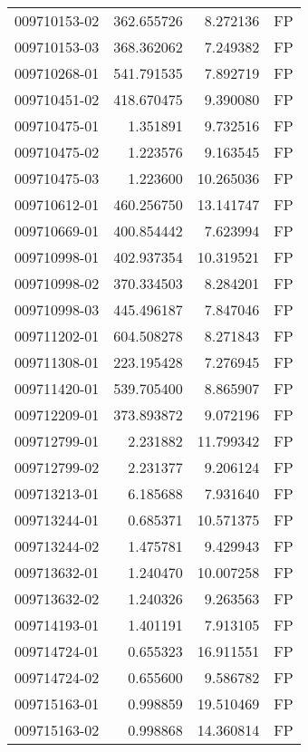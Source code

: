 \begin{tabular}{lrrl}
009710153-02 &  362.655726 &       8.272136 &   FP \\
009710153-03 &  368.362062 &       7.249382 &   FP \\
009710268-01 &  541.791535 &       7.892719 &   FP \\
009710451-02 &  418.670475 &       9.390080 &   FP \\
009710475-01 &    1.351891 &       9.732516 &   FP \\
009710475-02 &    1.223576 &       9.163545 &   FP \\
009710475-03 &    1.223600 &      10.265036 &   FP \\
009710612-01 &  460.256750 &      13.141747 &   FP \\
009710669-01 &  400.854442 &       7.623994 &   FP \\
009710998-01 &  402.937354 &      10.319521 &   FP \\
009710998-02 &  370.334503 &       8.284201 &   FP \\
009710998-03 &  445.496187 &       7.847046 &   FP \\
009711202-01 &  604.508278 &       8.271843 &   FP \\
009711308-01 &  223.195428 &       7.276945 &   FP \\
009711420-01 &  539.705400 &       8.865907 &   FP \\
009712209-01 &  373.893872 &       9.072196 &   FP \\
009712799-01 &    2.231882 &      11.799342 &   FP \\
009712799-02 &    2.231377 &       9.206124 &   FP \\
009713213-01 &    6.185688 &       7.931640 &   FP \\
009713244-01 &    0.685371 &      10.571375 &   FP \\
009713244-02 &    1.475781 &       9.429943 &   FP \\
009713632-01 &    1.240470 &      10.007258 &   FP \\
009713632-02 &    1.240326 &       9.263563 &   FP \\
009714193-01 &    1.401191 &       7.913105 &   FP \\
009714724-01 &    0.655323 &      16.911551 &   FP \\
009714724-02 &    0.655600 &       9.586782 &   FP \\
009715163-01 &    0.998859 &      19.510469 &   FP \\
009715163-02 &    0.998868 &      14.360814 &   FP \\

\end{tabular}

